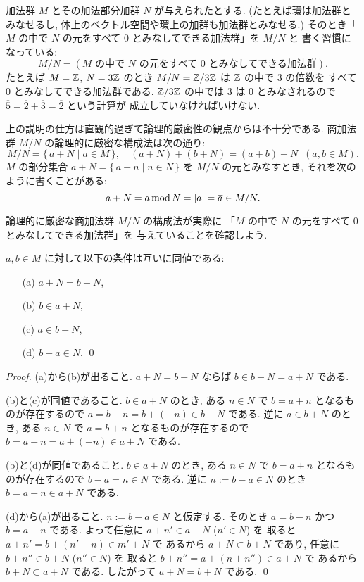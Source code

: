 \documentclass[12pt,twoside]{jarticle}
\begin{document}
加法群 $M$ とその加法部分加群 $N$ が与えられたとする.
(たとえば環は加法群とみなせるし, 
体上のベクトル空間や環上の加群も加法群とみなせる.)
そのとき「$M$ の中で $N$ の元をすべて $0$ とみなしてできる加法群」を $M/N$ と
書く習慣になっている:
\begin{equation*}
 M/N = (\text{$M$ の中で $N$ の元をすべて $0$ とみなしてできる加法群}).
\end{equation*}
たとえば $M={\mathbb Z}$, $N=3{\mathbb Z}$ のとき $M/N={\mathbb Z}/3{\mathbb Z}$ は ${\mathbb Z}$ の中で $3$ の倍数を
すべて $0$ とみなしてできる加法群である. 
${\mathbb Z}/3{\mathbb Z}$ の中では $3$ は $0$ とみなされるので %
$\overline{5}=\overline{2}+\overline{3}=\overline{2}$ という計算が
成立していなければいけない.

上の説明の仕方は直観的過ぎて論理的厳密性の観点からは不十分である.
商加法群 $M/N$ の論理的に厳密な構成法は次の通り:
\begin{equation*}
 M/N = \{\, a+N \mid a\in M \,\}, \quad
 (a+N)+(b+N) = (a+b)+N \;\;(a,b\in M).
\end{equation*}
$M$ の部分集合 $a+N=\{\,a+n\mid n\in N\,\}$ を $M/N$ の元とみなすとき, 
それを次のように書くことがある:
\begin{equation*}
 a+N = a\mathop{\mathrm{mod}}\nolimits N = [a] = \overline{a} \in M/N.
\end{equation*}

論理的に厳密な商加法群 $M/N$ の構成法が実際に
「$M$ の中で $N$ の元をすべて $0$ とみなしてできる加法群」を
与えていることを確認しよう.

\begin{lemma}
\label{lemma:a+N=b+N}
 $a,b\in M$ に対して以下の条件は互いに同値である:
 \begin{enumerate}
  \item[(a)] $a+N=b+N$,
  \item[(b)] $b\in a+N$,
  \item[(c)] $a\in b+N$,
  \item[(d)] $b-a\in N$.
   \qed
 \end{enumerate} 
\end{lemma}

\begin{proof}
 (a)から(b)が出ること.
 $a+N=b+N$ ならば $b\in b+N=a+N$ である.

 (b)と(c)が同値であること.
 $b\in a+N$ のとき, ある $n\in N$ で $b=a+n$ となるものが存在するので %
 $a=b-n=b+(-n)\in b+N$ である.
 逆に $a\in b+N$ のとき, ある $n\in N$ で $a=b+n$ となるものが存在するので %
 $b=a-n=a+(-n)\in a+N$ である.

 (b)と(d)が同値であること.
 $b\in a+N$ のとき, ある $n\in N$ で $b=a+n$ となるものが存在するので %
 $b-a=n\in N$ である.
 逆に $n:=b-a\in N$ のとき $b=a+n\in a+N$ である.

 (d)から(a)が出ること.
 $n:=b-a\in N$ と仮定する.
 そのとき $a=b-n$ かつ $b=a+n$ である.
 よって任意に $a+n'\in a+N$ ($n'\in N$) を
 取ると $a+n'=b+(n'-n)\in m'+N$ で
 あるから $a+N\subset b+N$ であり, 
 任意に $b+n''\in b+N$ ($n''\in N$) を
 取ると $b+n''=a+(n+n'')\in a+N$ で
 あるから $b+N\subset a+N$ である.
 したがって $a+N=b+N$ である.
 \qed
\end{proof}
\end{document}
